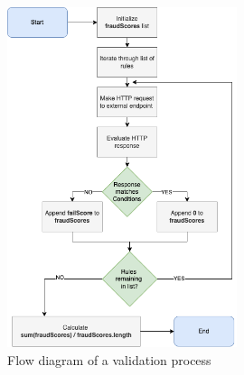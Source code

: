   \begin{figure}[!ht]
    \centering
    \includegraphics[width=0.6\textwidth]{diagrams/flow.png}
    \caption{Flow diagram of a validation process}
    \label{fig:flow_validation}
  \end{figure}
  
\newpage
\thispagestyle{empty}      
\noindent

\newpage
